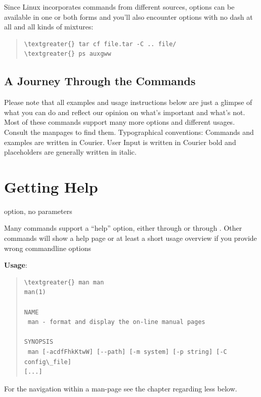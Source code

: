\documentclass[letterpaper,10pt,english]{sphinxmanual}
\begin{document}
Since Linux incorporates commands from different sources, options can be available in one or both forms and you’ll also encounter options with no dash at all and all kinds of mixtures:
\begin{quote}

\begin{Verbatim}[commandchars=\\\{\}]
\textgreater{} tar cf file.tar -C .. file/
\textgreater{} ps auxgww
\end{Verbatim}
\end{quote}


\subsection{A Journey Through the Commands}
\label{introduction:a-journey-through-the-commands}
Please note that all examples and usage instructions below are just a glimpse of what you can do and reflect our opinion on what’s important and what’s not. Most of these commands support many more options and different usages. Consult the manpages to find them.
Typographical conventions: Commands and examples are written in Courier.  User Input is written in Courier bold and placeholders are generally written in italic.


\section{Getting Help}
\label{introduction:getting-help}\label{introduction:help}
 option, no parameters

Many commands support a “help” option, either through  or through .
Other commands will show a help page or at least a short usage overview if you provide wrong commandline options

\textbf{Usage}:
\begin{quote}

\begin{Verbatim}[commandchars=\\\{\}]
\textgreater{} man man
man(1)

NAME
 man - format and display the on-line manual pages

SYNOPSIS
 man [-acdfFhkKtwW] [--path] [-m system] [-p string] [-C config\_file]
[...]
\end{Verbatim}
\end{quote}

For the navigation within a man-page see the chapter regarding less below.
\end{document}
